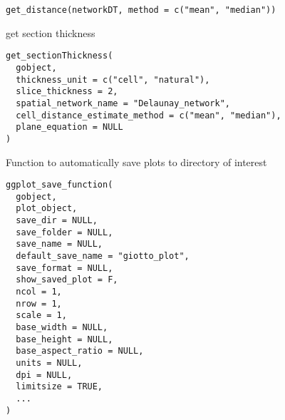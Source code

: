 \documentclass[a4paper]{book}
\begin{document}
%
\begin{Usage}
\begin{verbatim}
get_distance(networkDT, method = c("mean", "median"))
\end{verbatim}
\end{Usage}
%
\begin{Description}\relax
get section thickness
\end{Description}
%
\begin{Usage}
\begin{verbatim}
get_sectionThickness(
  gobject,
  thickness_unit = c("cell", "natural"),
  slice_thickness = 2,
  spatial_network_name = "Delaunay_network",
  cell_distance_estimate_method = c("mean", "median"),
  plane_equation = NULL
)
\end{verbatim}
\end{Usage}
%
\begin{Description}\relax
Function to automatically save plots to directory of interest
\end{Description}
%
\begin{Usage}
\begin{verbatim}
ggplot_save_function(
  gobject,
  plot_object,
  save_dir = NULL,
  save_folder = NULL,
  save_name = NULL,
  default_save_name = "giotto_plot",
  save_format = NULL,
  show_saved_plot = F,
  ncol = 1,
  nrow = 1,
  scale = 1,
  base_width = NULL,
  base_height = NULL,
  base_aspect_ratio = NULL,
  units = NULL,
  dpi = NULL,
  limitsize = TRUE,
  ...
)
\end{verbatim}
\end{Usage}
%
\end{document}
